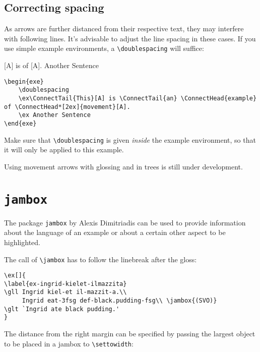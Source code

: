\subsection{Correcting spacing}
As arrows are further distanced from their respective text, they may interfere with following lines. It's advisable to adjust the line spacing in these cases. If you use simple example environments, a \verb+\doublespacing+ will suffice:\largerpage

\begin{exe}\doublespacing
\ex{}[A] is   of [A].
\ex Another Sentence

\singlespacing
\begin{lstlisting}
\begin{exe}
    \doublespacing
    \ex\ConnectTail{This}[A] is \ConnectTail{an} \ConnectHead{example} of \ConnectHead*[2ex]{movement}[A].
    \ex Another Sentence
\end{exe}
\end{lstlisting}
\end{exe}
Make sure that \verb+\doublespacing+ is given \emph{inside} the example environment, so that it will only be applied to this example.

Using movement arrows with glossing and in trees is still under development.

\section{\texttt{jambox}}
\label{sec-jambox}


The package \texttt{jambox} by Alexis Dimitriadis can be used to provide information about the language of an example or
about a certain other aspect to be highlighted.

\settowidth{}
\eal
{}
\zl

The call of \verb+\jambox+ has to follow the linebreak after the gloss:
\begin{verbatim}
\ex[]{
\label{ex-ingrid-kielet-ilmazzita}
\gll Ingrid kiel-et il-mazzit-a.\\
     Ingrid eat-3fsg def-black.pudding-fsg\\ \jambox{(SVO)}
\glt `Ingrid ate black pudding.'
}
\end{verbatim}
The distance from the right margin can be specified by passing the largest object to be placed in a
jambox to \verb+\settowidth+:

